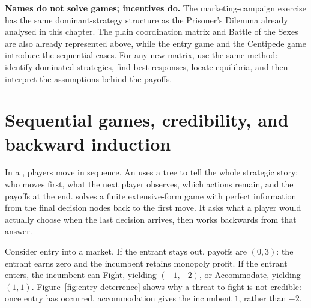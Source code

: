 \begin{keyidea}
\textbf{Names do not solve games; incentives do.}
The marketing-campaign exercise has the same dominant-strategy structure as
the Prisoner's Dilemma already analysed in this chapter. The plain
coordination matrix and Battle of the Sexes are also already represented
above, while the entry game and the Centipede game introduce the sequential
cases. For any new matrix, use the same method: identify dominated strategies,
find best responses, locate equilibria, and then interpret the assumptions
behind the payoffs.
\end{keyidea}

\section{Sequential games, credibility, and backward induction}

In a , players move in sequence. An
 uses a tree to tell the whole strategic story:
who moves first, what the next player observes, which actions remain, and the
payoffs at the end.  solves a finite
extensive-form game with perfect information from the final decision nodes
back to the first move. It asks what a player would actually choose when the
last decision arrives, then works backwards from that answer.

Consider entry into a market. If the entrant stays out, payoffs are
\((0,3)\): the entrant earns zero and the incumbent retains monopoly profit.
If the entrant enters, the incumbent can Fight, yielding \((-1,-2)\), or
Accommodate, yielding \((1,1)\). Figure~\ref{fig:entry-deterrence} shows why a
threat to fight is not credible: once entry has occurred, accommodation gives
the incumbent \(1\), rather than \(-2\).

